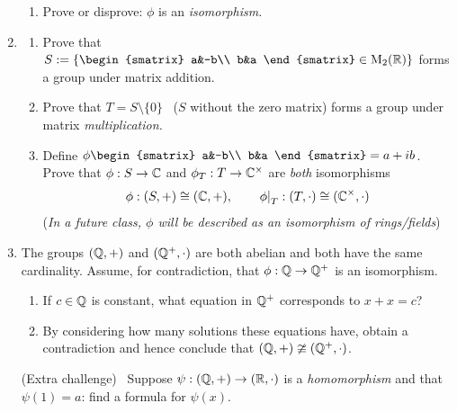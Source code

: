 \begin{exercises}{}
\begin{enumerate}
\begin{enumerate}
			\item Prove or disprove: $\phi$ is an \emph{isomorphism.}
		\end{enumerate}
		
	
	  \item\begin{enumerate}
	    \item Prove that $S:=\left\{
	    \begin{smatrix}
	    	a&-b\\
	    	b&a
	    \end{smatrix}
	    \in \rM_2(\R)\right\}$ forms a group under matrix addition.
	    
	    \item Prove that $T=S\setminus\{0\}$ \ ($S$ without the zero matrix) forms a group under matrix \emph{multiplication.}
	    \item Define $\phi
	    \begin{smatrix}
		    a&-b\\
		    b&a
	    \end{smatrix}
	    =a+ib$. Prove that $\phi:S\to\mathbb{C}$ and $\phi_T:T\to\mathbb{C}^\times$ are \emph{both} isomorphisms
	    \[
	    	\phi:(S,+)\cong(\mathbb{C},+),\qquad \left.\phi\right|_{T}:(T,\cdot)\cong(\mathbb{C}^\times,\cdot)
	    \]
	    (\emph{In a future class, $\phi$ will be described as an isomorphism of rings/fields})
	  \end{enumerate}
	  
	  
	  
		
		\item The groups $(\mathbb{Q},+)$ and $(\mathbb{Q}^+,\cdot)$ are both abelian and both have the same cardinality. Assume, for contradiction, that $\phi:\mathbb{Q}\to\mathbb{Q}^+$ is an isomorphism.
		\begin{enumerate}
		  \item If $c\in\mathbb{Q}$ is constant, what equation in $\mathbb{Q}^+$ corresponds to $x+x=c$?
		  
		  \item By considering how many solutions these equations have, obtain a contradiction and hence conclude that $(\mathbb{Q},+)\ncong(\mathbb{Q}^+,\cdot)$.
		\end{enumerate}
		(Extra challenge) \ Suppose $\psi:(\mathbb{Q},+)\to(\mathbb{R},\cdot)$ is a \emph{homomorphism} and that $\psi(1)=a$: find a formula for $\psi(x)$.
		

\end{enumerate}
\end{exercises}
